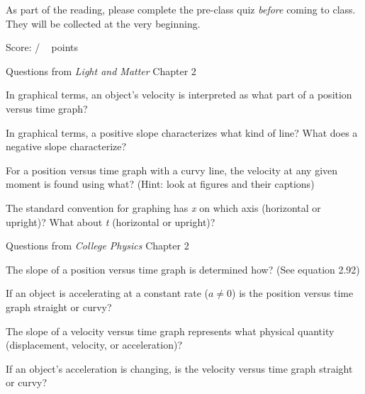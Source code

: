 \documentclass[addpoints,12pt]{exam}
\begin{document}
As part of the reading, please complete the pre-class quiz \textit{before} coming to class. They will be collected at the very beginning.
 
\clearpage

\begin{flushright}
Score: \hspace{0.2in} / \numpoints ~ points
\end{flushright}

\noindent Questions from \textit{Light and Matter} Chapter 2

\begin{questions}

\question[1]
In graphical terms, an object's velocity is interpreted as what part of a position versus time graph?
\fillwithlines{0.5in}

\question[2]
In graphical terms, a positive slope characterizes what kind of line? What does a negative slope characterize?
\fillwithlines{0.5in}

\question[1]
For a position versus time graph with a curvy line, the velocity at any given moment is found using what? (Hint: look at figures and their captions)
\fillwithlines{0.75in}

\question[2]
The standard convention for graphing has \textit{x} on which axis (horizontal or upright)? What about \textit{t} (horizontal or upright)?
\fillwithlines{0.5in}

\end{questions}

\noindent Questions from \textit{College Physics} Chapter 2

\begin{questions}
\question[1]
The slope of a position versus time graph is determined how? (See equation 2.92)
\fillwithlines{0.5in}

\question[1]
If an object is accelerating at a constant rate ($a \neq 0$) is the position versus time graph straight or curvy?
\fillwithlines{0.5in}

\question[1]
The slope of a velocity versus time graph represents what physical quantity (displacement, velocity, or acceleration)?
\fillwithlines{0.5in}

\question[1] 
If an object's acceleration is changing, is the velocity versus time graph straight or curvy?
\fillwithlines{0.5in}

\end{questions}
\end{document}
